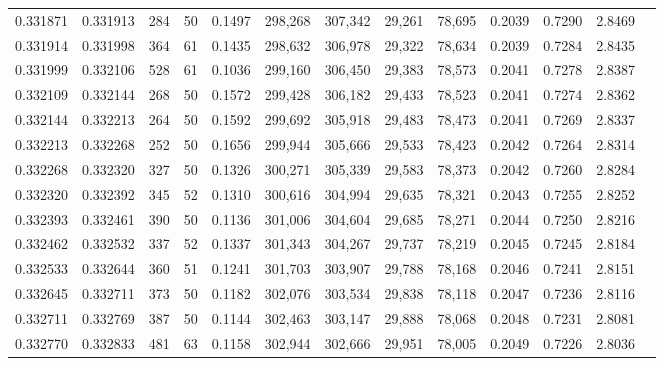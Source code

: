 \begin{tabular}{rrrrrrrrrrrrr}
0.331871 & 0.331913 &   284 &  50 &                                     0.1497 & 298,268 & 307,342 &  29,261 &  78,695 & 0.2039 & 0.7290 & 2.8469 \\
0.331914 & 0.331998 &   364 &  61 &                                     0.1435 & 298,632 & 306,978 &  29,322 &  78,634 & 0.2039 & 0.7284 & 2.8435 \\
0.331999 & 0.332106 &   528 &  61 &                                     0.1036 & 299,160 & 306,450 &  29,383 &  78,573 & 0.2041 & 0.7278 & 2.8387 \\
0.332109 & 0.332144 &   268 &  50 &                                     0.1572 & 299,428 & 306,182 &  29,433 &  78,523 & 0.2041 & 0.7274 & 2.8362 \\
0.332144 & 0.332213 &   264 &  50 &                                     0.1592 & 299,692 & 305,918 &  29,483 &  78,473 & 0.2041 & 0.7269 & 2.8337 \\
0.332213 & 0.332268 &   252 &  50 &                                     0.1656 & 299,944 & 305,666 &  29,533 &  78,423 & 0.2042 & 0.7264 & 2.8314 \\
0.332268 & 0.332320 &   327 &  50 &                                     0.1326 & 300,271 & 305,339 &  29,583 &  78,373 & 0.2042 & 0.7260 & 2.8284 \\
0.332320 & 0.332392 &   345 &  52 &                                     0.1310 & 300,616 & 304,994 &  29,635 &  78,321 & 0.2043 & 0.7255 & 2.8252 \\
0.332393 & 0.332461 &   390 &  50 &                                     0.1136 & 301,006 & 304,604 &  29,685 &  78,271 & 0.2044 & 0.7250 & 2.8216 \\
0.332462 & 0.332532 &   337 &  52 &                                     0.1337 & 301,343 & 304,267 &  29,737 &  78,219 & 0.2045 & 0.7245 & 2.8184 \\
0.332533 & 0.332644 &   360 &  51 &                                     0.1241 & 301,703 & 303,907 &  29,788 &  78,168 & 0.2046 & 0.7241 & 2.8151 \\
0.332645 & 0.332711 &   373 &  50 &                                     0.1182 & 302,076 & 303,534 &  29,838 &  78,118 & 0.2047 & 0.7236 & 2.8116 \\
0.332711 & 0.332769 &   387 &  50 &                                     0.1144 & 302,463 & 303,147 &  29,888 &  78,068 & 0.2048 & 0.7231 & 2.8081 \\
0.332770 & 0.332833 &   481 &  63 &                                     0.1158 & 302,944 & 302,666 &  29,951 &  78,005 & 0.2049 & 0.7226 & 2.8036 \\

\end{tabular}
